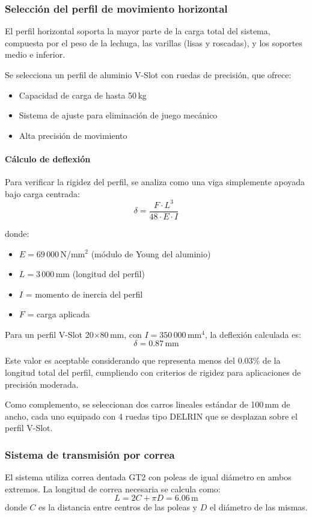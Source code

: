 \subsubsection{Selección del perfil de movimiento horizontal}
El perfil horizontal soporta la mayor parte de la carga total del sistema, compuesta por el peso de la lechuga, las varillas (lisas y roscadas), y los soportes medio e inferior.

Se selecciona un perfil de aluminio V-Slot con ruedas de precisión, que ofrece:
\begin{itemize}
    \item Capacidad de carga de hasta 50\,kg
    \item Sistema de ajuste para eliminación de juego mecánico
    \item Alta precisión de movimiento
\end{itemize}

\paragraph{Cálculo de deflexión}
Para verificar la rigidez del perfil, se analiza como una viga simplemente apoyada bajo carga centrada:
\begin{equation}
\delta = \frac{F \cdot L^3}{48 \cdot E \cdot I}
\label{eq:deflexion_perfil}
\end{equation}

donde:
\begin{itemize}
    \item $E = 69\,000$\,N/mm$^2$ (módulo de Young del aluminio)
    \item $L = 3\,000$\,mm (longitud del perfil)
    \item $I$ = momento de inercia del perfil
    \item $F$ = carga aplicada
\end{itemize}

Para un perfil V-Slot 20$\times$80\,mm, con $I = 350\,000$\,mm$^4$, la deflexión calculada es:
\[\delta = 0.87\,\text{mm}\]

Este valor es aceptable considerando que representa menos del 0.03\% de la longitud total del perfil, cumpliendo con criterios de rigidez para aplicaciones de precisión moderada.

Como complemento, se seleccionan dos carros lineales estándar de 100\,mm de ancho, cada uno equipado con 4 ruedas tipo DELRIN que se desplazan sobre el perfil V-Slot.

\subsubsection{Sistema de transmisión por correa}
El sistema utiliza correa dentada GT2 con poleas de igual diámetro en ambos extremos. La longitud de correa necesaria se calcula como:
\begin{equation}
L = 2C + \pi D = 6.06\,\text{m}
\label{eq:longitud_correa}
\end{equation}
donde $C$ es la distancia entre centros de las poleas y $D$ el diámetro de las mismas.

